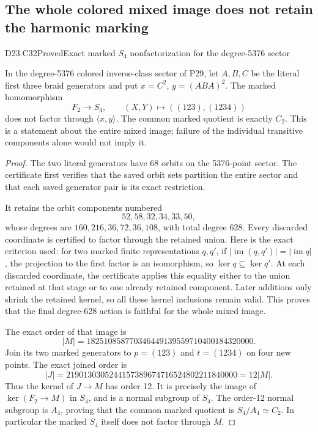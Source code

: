 \subsection{The whole colored mixed image does not retain the harmonic marking}

\begin{statement}{D23.C32}{Proved}{Exact marked $S_4$ nonfactorization for the degree-5376 sector}
\end{statement}
In the degree-5376 colored inverse-class sector of P29,
let $A,B,C$ be the literal first three braid generators
and put $x=C^2$, $y=(ABA)^2$.
The marked homomorphism
\[
                   F_2\longrightarrow S_4,\qquad
                   (X,Y)\longmapsto((123),(1234))
\]
does not factor through $\langle x,y\rangle$.
The common marked quotient is exactly $C_2$.
This is a statement about the entire mixed image;
failure of the individual transitive components alone
would not imply it.

\begin{proof}
The two literal generators have 68 orbits on the
5376-point sector.  The certificate first verifies
that the saved orbit sets partition the entire
sector and that each saved generator pair is its
exact restriction.

It retains the orbit components numbered
\[
                           52,58,32,34,33,50,
\]
whose degrees are $160,216,36,72,36,108$, with total
degree 628.  Every discarded coordinate is certified
to factor through the retained union.
Here is the exact criterion used: for two marked
finite representations $q,q'$, if
$|\operatorname{im}(q,q')|=|\operatorname{im}q|$,
the projection to the first factor is an isomorphism,
so $\ker q\subseteq\ker q'$.  At each discarded
coordinate, the certificate applies this equality
either to the union retained at that stage or to
one already retained component.  Later additions
only shrink the retained kernel, so all these
kernel inclusions remain valid.  This proves that
the final degree-628 action is faithful for the
whole mixed image.

The exact order of that image is
\[
            |M|=182510858770346449139559710400184320000.
\]
Join its two marked generators to
$p=(123)$ and $t=(1234)$ on four new points.
The exact joined order is
\[
 |J|=2190130305244157389674716524802211840000=12|M|.
\]
Thus the kernel of $J\to M$ has order 12.
It is precisely the image of $\ker(F_2\to M)$
in $S_4$, and is a normal subgroup of $S_4$.
The order-12 normal subgroup is $A_4$, proving
that the common marked quotient is
$S_4/A_4\simeq C_2$.
In particular the marked $S_4$ itself does not
factor through $M$.
\end{proof}

